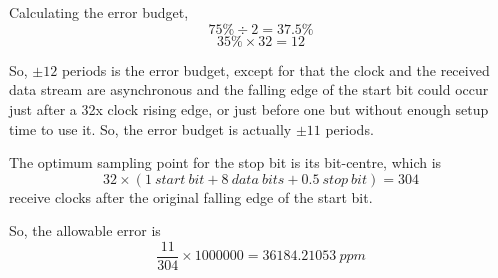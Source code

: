 \section{}
\begin{comment}
\begin{align*}
  \frac{\SI{1500}{bytes} \times \SI{8}{bits/byte}}{\SI{115200}{bits/\second}}&=
  \frac{5}{48}\SI{}{\second}
\end{align*}
\end{comment}


Calculating the error budget,
\[75\% \div 2 = 37.5\%\]
\[35\% \times 32 = 12\]

So, \(\pm 12\) periods is the error budget, except for that the
clock and the received data stream are asynchronous and the falling edge of the
start bit could occur just after a 32x clock rising edge, or just before one but
without enough setup time to use it. So, the error budget is actually \(\pm
11\) periods.

The optimum sampling point for the stop bit is its bit-centre,
which is
\[32 \times (1~start~bit + 8~data~bits + 0.5~stop~bit) = 304 \]
receive clocks after the original falling edge of the start bit.

So, the allowable error is
\[\frac{11}{304} \times 1000000 = 36184.21053~ppm\]
